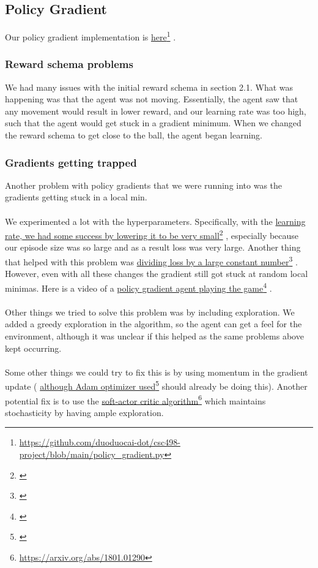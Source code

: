 \documentclass[twoside,11pt]{article}
\newcommand\fnurl[2]{%
  \href{#2}{#1}\footnote{\url{#2}}%
}
\begin{document}
\subsection{Policy Gradient}
Our policy gradient implementation is \fnurl{here}{https://github.com/duoduocai-dot/csc498-project/blob/main/policy_gradient.py}. 
\subsubsection{Reward schema problems}
We had many issues with the initial reward schema in section 2.1. What was happening was that the agent was not moving. Essentially, the agent saw that any movement would result in lower reward, and  our learning rate was too high, such that the agent would get stuck in a gradient minimum. When we changed the reward schema to get close to the ball, the agent began learning.
\subsubsection{Gradients getting trapped}
Another problem with policy gradients that we were running into was the gradients getting stuck in a local min. 
\\\\We experimented a lot with the hyperparameters. Specifically, with the \fnurl{learning rate, we had some success by lowering it to be very small}{}, especially because our episode size was so large and as a result loss was very large. Another thing that helped with this problem was \fnurl{dividing loss by a large constant number}{}. However, even with all these changes the gradient still got stuck at random local minimas. Here is a video of a \fnurl{policy gradient agent playing the game}{}.
\\\\
Other things we tried to solve this problem was by including exploration. We added a greedy exploration in the algorithm, so the agent can get a feel for the environment, although it was unclear if this helped as the same problems above kept occurring. 
\\\\
Some other things we could try to fix this is by using momentum in the gradient update (\fnurl{although Adam optimizer used}{} should already be doing this). Another potential fix is to use the \fnurl{soft-actor critic algorithm}{https://arxiv.org/abs/1801.01290} which maintains stochasticity by having ample exploration. 
\end{document}
